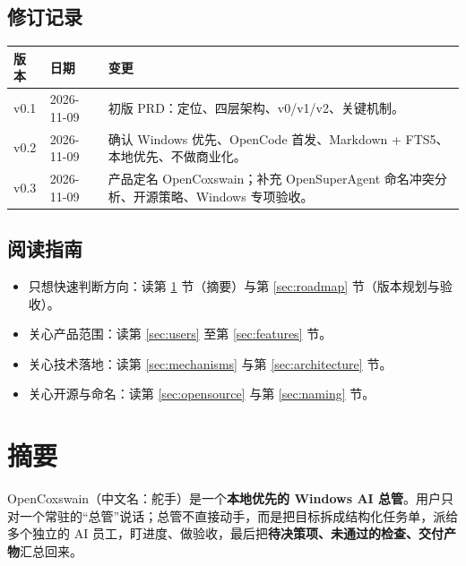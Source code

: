 \documentclass[UTF8,11pt,a4paper,fontset=windows]{ctexart}
\let\ocsection\section
\renewcommand{\section}{\Needspace{8\baselineskip}\ocsection}
\let\ocsubsection\subsection
\renewcommand{\subsection}{\Needspace{5\baselineskip}\ocsubsection}
\begin{document}
\subsection*{修订记录}
\noindent\begin{minipage}{\linewidth}
\centering
\small
\begin{tabularx}{\linewidth}{@{}p{1.5cm} p{2.4cm} X@{}}
\toprule
\textbf{版本} & \textbf{日期} & \textbf{变更} \\
\midrule
v0.1 & 2026-11-09 & 初版 PRD：定位、四层架构、v0/v1/v2、关键机制。 \\
v0.2 & 2026-11-09 & 确认 Windows 优先、OpenCode 首发、Markdown + FTS5、本地优先、不做商业化。 \\
v0.3 & 2026-11-09 & 产品定名 OpenCoxswain；补充 OpenSuperAgent 命名冲突分析、开源策略、Windows 专项验收。 \\
\bottomrule
\end{tabularx}
\end{minipage}

\subsection*{阅读指南}
\begin{itemize}
  \item 只想快速判断方向：读第 \ref{sec:summary} 节（摘要）与第 \ref{sec:roadmap} 节（版本规划与验收）。
  \item 关心产品范围：读第 \ref{sec:users} 至第 \ref{sec:features} 节。
  \item 关心技术落地：读第 \ref{sec:mechanisms} 与第 \ref{sec:architecture} 节。
  \item 关心开源与命名：读第 \ref{sec:opensource} 与第 \ref{sec:naming} 节。
\end{itemize}

\newpage
\tableofcontents
\newpage

\section{摘要}
\label{sec:summary}

OpenCoxswain（中文名：舵手）是一个\textbf{本地优先的 Windows AI 总管}。用户只对一个常驻的“总管”说话；总管不直接动手，而是把目标拆成结构化任务单，派给多个独立的 AI 员工，盯进度、做验收，最后把\textbf{待决策项、未通过的检查、交付产物}汇总回来。
\end{document}
